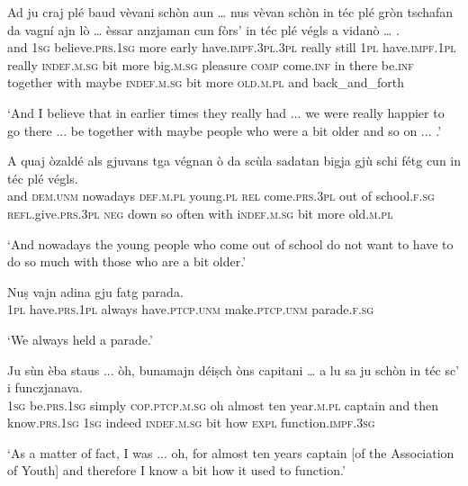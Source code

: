 \begin{linenumbers}
	\gll  Ad ju craj plé baud vèvani schòn aun … nus vèvan schòn in téc plé gròn tschafan da vagní ajn lò … èssar anzjaman cun fòrs’ in téc plé végls a vidanò … . \\
	and \textsc{1sg} believe.\textsc{prs.1sg} more early have.\textsc{impf.3pl.3pl} really still {} \textsc{1pl} have.\textsc{impf.1pl} really \textsc{indef.m.sg} bit more big.\textsc{m.sg} pleasure \textsc{comp} come.\textsc{inf} in there {} be.\textsc{inf} together with maybe \textsc{indef.m.sg} bit more \textsc{old.m.pl} and back\_and\_forth \\
\end{linenumbers}
\medskip
\glt `And I believe that in earlier times they really had ... we were really happier to go there ... be together with maybe people who were a bit older and so on ... .'
\medskip

\begin{linenumbers}
	\gll A quaj òzaldé als gjuvans tga végnan ò da scùla sadatan bigja gjù schi fétg cun in téc plé végls.   \\
	and \textsc{dem.unm} nowadays \textsc{def.m.pl} young.\textsc{pl} \textsc{rel} come.\textsc{prs.3pl} out of school.\textsc{f.sg} \textsc{refl}.give.\textsc{prs.3pl} \textsc{neg} down so often with i\textsc{ndef.m.sg} bit more old.\textsc{m.pl}\\
\end{linenumbers}
\medskip
\glt `And nowadays the young people who come out of school do not want to have to do so much with those who are a bit older.'
\medskip

\begin{linenumbers}
	\gll Nuṣ vajn adina gju fatg parada.   \\
	\textsc{1pl} have.\textsc{prs.1pl} always have.\textsc{ptcp.unm} make.\textsc{ptcp.unm} parade.\textsc{f.sg}\\
\end{linenumbers}
\medskip
\glt `We always held a parade.'
\medskip

\begin{linenumbers}
	\gll Ju sùn èba staus ... òh, bunamajn déiṣch òns capitani … a lu sa ju schòn in téc sc’ i funczjanava.   \\
\textsc{1sg} be.\textsc{prs.1sg} simply \textsc{cop.ptcp.m.sg} {} oh almost ten year\textsc{.m.pl} captain {} and then know.\textsc{prs.1sg} \textsc{1sg} indeed \textsc{indef.m.sg} bit how \textsc{expl} function.\textsc{impf.3sg}\\
\end{linenumbers}
\medskip
\glt `As a matter of fact, I was ... oh, for almost ten years captain [of the Association of Youth] {} and therefore I know a bit how it used to function.'
\medskip

